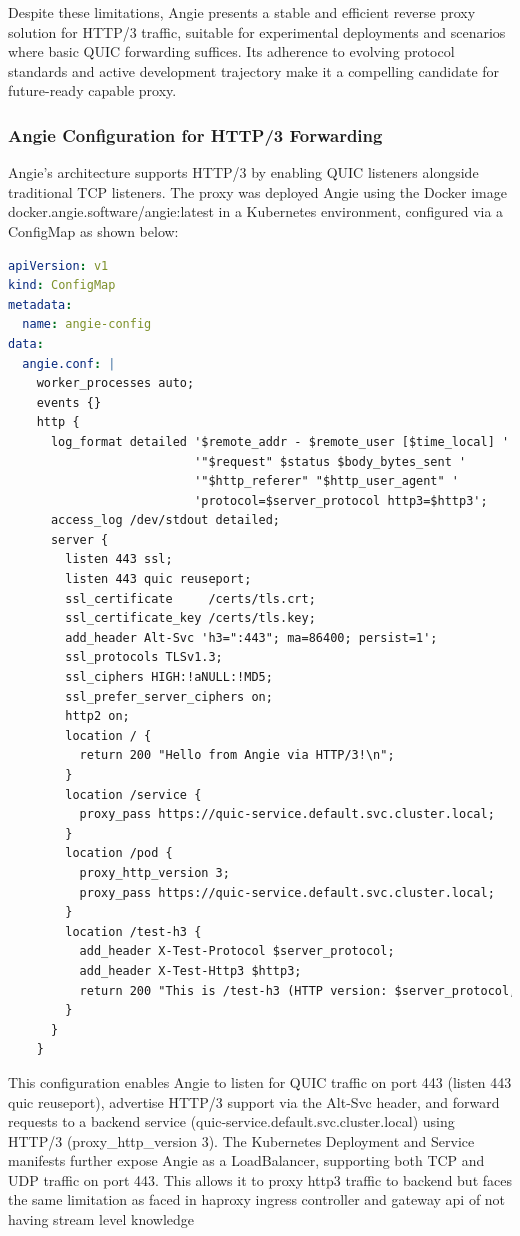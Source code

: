 Despite these limitations, Angie presents a stable and efficient reverse proxy solution for HTTP/3 traffic, suitable for experimental deployments and scenarios where basic QUIC forwarding suffices. Its adherence to evolving protocol standards and active development trajectory make it a compelling candidate for future-ready capable proxy.

\subsubsection{Angie Configuration for HTTP/3 Forwarding}
Angie's architecture supports HTTP/3 by enabling QUIC listeners alongside traditional TCP listeners. The proxy was deployed Angie using the Docker image docker.angie.software/angie:latest in a Kubernetes environment, configured via a ConfigMap as shown below:

\begin{lstlisting}[language=yaml]
apiVersion: v1
kind: ConfigMap
metadata:
  name: angie-config
data:
  angie.conf: |
    worker_processes auto;
    events {}
    http {
      log_format detailed '$remote_addr - $remote_user [$time_local] '
                          '"$request" $status $body_bytes_sent '
                          '"$http_referer" "$http_user_agent" '
                          'protocol=$server_protocol http3=$http3';
      access_log /dev/stdout detailed;
      server {
        listen 443 ssl;
        listen 443 quic reuseport;
        ssl_certificate     /certs/tls.crt;
        ssl_certificate_key /certs/tls.key;
        add_header Alt-Svc 'h3=":443"; ma=86400; persist=1';
        ssl_protocols TLSv1.3;
        ssl_ciphers HIGH:!aNULL:!MD5;
        ssl_prefer_server_ciphers on;
        http2 on;
        location / {
          return 200 "Hello from Angie via HTTP/3!\n";
        }
        location /service {
          proxy_pass https://quic-service.default.svc.cluster.local;
        }
        location /pod {
          proxy_http_version 3;
          proxy_pass https://quic-service.default.svc.cluster.local;
        }
        location /test-h3 {
          add_header X-Test-Protocol $server_protocol;
          add_header X-Test-Http3 $http3;
          return 200 "This is /test-h3 (HTTP version: $server_protocol, http3: $http3)\n";
        }
      }
    }
\end{lstlisting}

This configuration enables Angie to listen for QUIC traffic on port 443 (listen 443 quic reuseport), advertise HTTP/3 support via the Alt-Svc header, and forward requests to a backend service (quic-service.default.svc.cluster.local) using HTTP/3 (proxy\_http\_version 3). The Kubernetes Deployment and Service manifests further expose Angie as a LoadBalancer, supporting both TCP and UDP traffic on port 443.
This allows it to proxy http3 traffic to backend but faces the same limitation as faced in haproxy ingress controller and gateway api of not having stream level knowledge

